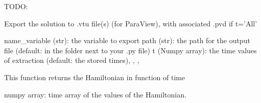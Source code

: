 \documentclass[letterpaper,10pt,english]{sphinxmanual}
\begin{document}
\begin{fulllineitems}
\begin{fulllineitems}
\label{\detokenize{scrimp:scrimp.dphs.DPHS.export_matrices}}
\pysigstartsignatures
\pysiglinewithargsret
{}
{\sphinxparamcomma {}\sphinxparamcomma {}\sphinxparamcomma {}}
{}
\pysigstopsignatures
\sphinxAtStartPar
TODO:

\end{fulllineitems}


\begin{fulllineitems}
\label{\detokenize{scrimp:scrimp.dphs.DPHS.export_to_pv}}
\pysigstartsignatures
\pysiglinewithargsret
{}
{\sphinxparamcomma {}\sphinxparamcomma {}}
{}
\pysigstopsignatures
\sphinxAtStartPar
Export the solution to .vtu file(s) (for ParaView), with associated .pvd if t=’All’

\sphinxAtStartPar
name\_variable (str): the variable to export
path (str): the path for the output file (default: in the  folder next to your .py file)
t (Numpy array): the time values of extraction (default:  the stored times), , , 

\end{fulllineitems}


\begin{fulllineitems}
\label{\detokenize{scrimp:scrimp.dphs.DPHS.get_Hamiltonian}}
\pysigstartsignatures
\pysiglinewithargsret
{}
{}
{}
\pysigstopsignatures
\sphinxAtStartPar
This function returns the Hamiltonian in function of time
\begin{description}
\sphinxAtStartPar
numpy array: time array of the values of the Hamiltonian.


\end{description}
\end{fulllineitems}
\end{fulllineitems}
\end{document}
